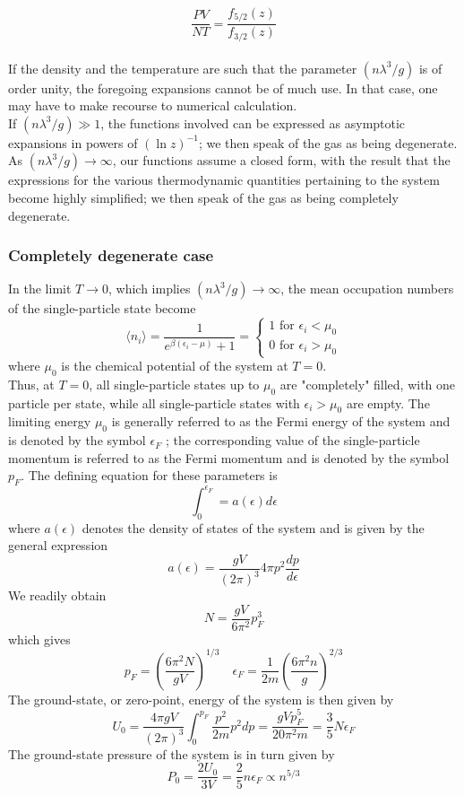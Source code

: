 \[\frac{PV}{NT} = \frac{f_{5/2}(z)}{f_{3/2}(z)}\]
\\
If the density and the temperature are such that the parameter $(n\lambda^3/g)$ is of order unity, the foregoing expansions cannot be of much use. In that case, one may have to make recourse to numerical calculation.
\\
If $(n\lambda^3/g) \gg 1$, the functions involved can be expressed as asymptotic expansions in powers of $(\ln z)^{-1}$; we then speak of the gas as being degenerate.
\\
As $(n\lambda^3/g) \to \infty$, our functions assume a closed form, with the result that the expressions for the various thermodynamic quantities pertaining to the system become highly simplified; we then speak of the gas as being completely degenerate.

\subsubsection{Completely degenerate case}
In the limit $T \to 0$, which implies $(n\lambda^3/g) \to \infty$, the mean occupation numbers of the single-particle state become
\[\langle n_i \rangle = \frac{1}{e^{\beta(\epsilon_i - \mu)} + 1} = \begin{cases}1 \mbox{ for } \epsilon_i < \mu_0 \\   0 \mbox{ for } \epsilon_i > \mu_0 \end{cases}\]
where $\mu_0$ is the chemical potential of the system at $T = 0$.
\\
Thus, at $T = 0$, all single-particle states up to $\mu_0$ are "completely" filled, with one particle per state, while all single-particle states with $\epsilon_i > \mu_0$ are empty. 
The limiting energy $\mu_0$ is generally referred to as the Fermi energy of the system and is denoted by the symbol $\epsilon_F$ ; the corresponding value of the single-particle momentum is referred to as the Fermi momentum and is denoted by the symbol $p_F$. The defining equation for these parameters is
\[\int_0^{\epsilon_F} = a(\epsilon)d\epsilon\]
where $a(\epsilon)$ denotes the density of states of the system and is given by the general expression
\[a(\epsilon) = \frac{gV}{(2\pi)^3} 4\pi p^2 \frac{dp}{d\epsilon}\]
We readily obtain
\[N = \frac{gV}{6\pi^2} p_F^3\]
which gives
\[p_F = \left( \frac{6\pi^2N}{gV} \right)^{1/3} \quad \epsilon_F = \frac{1}{2m}\left( \frac{6\pi^2n}{g} \right)^{2/3}\]
The ground-state, or zero-point, energy of the system is then given by
\[U_0 = \frac{4\pi gV}{(2\pi)^3} \int_0^{p_F} \frac{p^2}{2m} p^2 dp = \frac{gVp_F^5}{20\pi^2m} = \frac{3}{5}N\epsilon_F\]
The ground-state pressure of the system is in turn given by
\[P_0 = \frac{2U_0}{3V} = \frac{2}{5}n\epsilon_F \propto n^{5/3}\]

